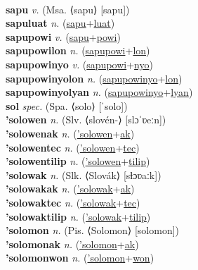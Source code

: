  \label{satilum} \\
\textbf{sapu} \textit{v.} (Msa. ⟨sapu⟩ [sapu])
 \label{sapu} \\
\textbf{sapuluat} \textit{n.} (\hyperref[sapu]{sapu}+\hyperref[luat]{luat})
 \label{sapuluat} \\
\textbf{sapupowi} \textit{v.} (\hyperref[sapu]{sapu}+\hyperref[powi]{powi})
 \label{sapupowi} \\
\textbf{sapupowilon} \textit{n.} (\hyperref[sapupowi]{sapupowi}+\hyperref[lon]{lon})
 \label{sapupowilon} \\
\textbf{sapupowinyo} \textit{v.} (\hyperref[sapupowi]{sapupowi}+\hyperref[nyo]{nyo})
 \label{sapupowinyo} \\
\textbf{sapupowinyolon} \textit{n.} (\hyperref[sapupowinyo]{sapupowinyo}+\hyperref[lon]{lon})
 \label{sapupowinyolon} \\
\textbf{sapupowinyolyan} \textit{n.} (\hyperref[sapupowinyo]{sapupowinyo}+\hyperref[lyan]{lyan})
 \label{sapupowinyolyan} \\
\textbf{sol} \textit{spec.} (Spa. ⟨solo⟩ [ˈsolo])
 \label{sol} \\
\textbf{'solowen} \textit{n.} (Slv. ⟨slovén-⟩ [slɔˈʋeːn])
 \label{'solowen} \\
\textbf{'solowenak} \textit{n.} (\hyperref['solowen]{'solowen}+\hyperref[ak]{ak})
 \label{'solowenak} \\
\textbf{'solowentec} \textit{n.} (\hyperref['solowen]{'solowen}+\hyperref[tec]{tec})
 \label{'solowentec} \\
\textbf{'solowentilip} \textit{n.} (\hyperref['solowen]{'solowen}+\hyperref[tilip]{tilip})
 \label{'solowentilip} \\
\textbf{'solowak} \textit{n.} (Slk. ⟨Slovák⟩ [sɫɔʋaːk])
 \label{'solowak} \\
\textbf{'solowakak} \textit{n.} (\hyperref['solowak]{'solowak}+\hyperref[ak]{ak})
 \label{'solowakak} \\
\textbf{'solowaktec} \textit{n.} (\hyperref['solowak]{'solowak}+\hyperref[tec]{tec})
 \label{'solowaktec} \\
\textbf{'solowaktilip} \textit{n.} (\hyperref['solowak]{'solowak}+\hyperref[tilip]{tilip})
 \label{'solowaktilip} \\
\textbf{'solomon} \textit{n.} (Pis. ⟨Solomon⟩ [solomon])
 \label{'solomon} \\
\textbf{'solomonak} \textit{n.} (\hyperref['solomon]{'solomon}+\hyperref[ak]{ak})
 \label{'solomonak} \\
\textbf{'solomonwon} \textit{n.} (\hyperref['solomon]{'solomon}+\hyperref[won]{won})
